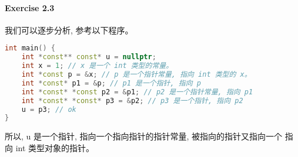 \documentclass{article}
\begin{document}
	\paragraph*{Exercise 2.3} 
	
	我们可以逐步分析, 参考以下程序。
	
	\begin{lstlisting}[language=C++]
int main() {
	int *const** const* u = nullptr;
	int x = 1; // x 是一个 int 类型的常量。
	int *const p = &x; // p 是一个指针常量, 指向 int 类型的 x。
	int	*const* p1 = &p; // p1 是一个指针, 指向 p
	int *const* *const p2 = &p1; // p2 是一个指针常量, 指向 p1
	int *const* *const* p3 = &p2; // p3 是一个指针, 指向 p2
	u = p3; // ok
}
	\end{lstlisting}
	
	所以, u 是一个指针, 指向一个指向指针的指针常量, 被指向的指针又指向一个 指向 int 类型对象的指针。
\end{document}
